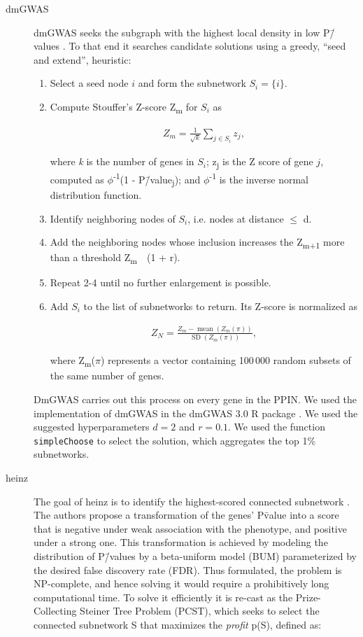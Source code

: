 \documentclass[10pt,letterpaper]{article}
\begin{document}
\begin{description}
\item[{dmGWAS}] dmGWAS seeks the subgraph with the highest local density in low P\=/values \cite{jia_dmgwas:_2011}. To that end it searches candidate solutions using a greedy, ``seed and extend'', heuristic:

\begin{enumerate}
\item Select a seed node $i$ and form the subnetwork $S_i=\{i\}$.
\item Compute Stouffer's Z-score Z\textsubscript{m} for $S_i$ as

\begin{eqnarray} 
Z_m = \frac{1}{\sqrt{k}} \sum_{j \in S_i} z_j,
\end{eqnarray}

where \emph{k} is the number of genes in $S_i$; z\textsubscript{j} is the Z score of gene $j$, computed as \(\phi\)\textsuperscript{-1}(1 - P\=/value\textsubscript{j}); and \(\phi\)\textsuperscript{-1} is the inverse normal distribution function.
\item Identify neighboring nodes of $S_i$,  i.e. nodes at distance \(\le\) d.
\item Add the neighboring nodes whose inclusion increases the Z\textsubscript{m+1} more than a threshold Z\textsubscript{m}~\texttimes{}~(1 + r).
\item Repeat 2-4 until no further enlargement is possible.
\item Add $S_i$ to the list of subnetworks to return. Its Z-score is normalized as

\begin{eqnarray}
Z_{N}=\frac{Z_{m}-\operatorname{mean}\left(Z_{m}(\pi)\right)}{\operatorname{SD}\left(Z_{m}(\pi)\right)},
\end{eqnarray} 

where Z\textsubscript{m}(\(\pi\)) represents a vector containing 100\,000 random subsets of the same number of genes.
\end{enumerate}

DmGWAS carries out this process on every gene in the PPIN. We used the implementation of dmGWAS in the dmGWAS 3.0 R package \cite{dmgwas}. We used the suggested hyperparameters $d = 2$ and $r = 0.1$. We used the function \texttt{simpleChoose} to select the solution, which aggregates the top 1\% subnetworks.

\item[{heinz}] The goal of heinz is to identify the highest-scored connected subnetwork \cite{dittrich_identifying_2008}. The authors propose a transformation of the genes' P\=value into a score that is negative under weak association with the phenotype, and positive under a strong one. This transformation is achieved by modeling the distribution of P\=/values by a beta-uniform model (BUM) parameterized by the desired false discovery rate (FDR). Thus formulated, the problem is NP-complete, and hence solving it would require a prohibitively long computational time. To solve it efficiently it is re-cast as the Prize-Collecting Steiner Tree Problem (PCST), which seeks to select the connected subnetwork S that maximizes the \emph{profit} p(S), defined as:


\end{description}
\end{document}
